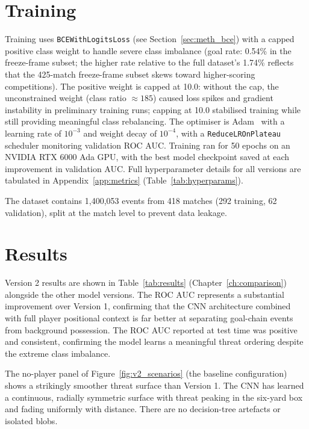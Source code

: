 \section{Training}

Training uses \texttt{BCEWithLogitsLoss} (see Section~\ref{sec:meth_bce}) with a capped positive class weight to handle severe class imbalance (goal rate: 0.54\% in the freeze-frame subset; the higher rate relative to the full dataset's 1.74\% reflects that the 425-match freeze-frame subset skews toward higher-scoring competitions). The positive weight is capped at 10.0: without the cap, the unconstrained weight (class ratio $\approx 185$) caused loss spikes and gradient instability in preliminary training runs; capping at 10.0 stabilised training while still providing meaningful class rebalancing. The optimiser is Adam~\cite{kingma2015} with a learning rate of $10^{-3}$ and weight decay of $10^{-4}$, with a \texttt{ReduceLROnPlateau} scheduler monitoring validation ROC AUC. Training ran for 50 epochs on an NVIDIA RTX 6000 Ada GPU, with the best model checkpoint saved at each improvement in validation AUC. Full hyperparameter details for all versions are tabulated in Appendix~\ref{app:metrics} (Table~\ref{tab:hyperparams}).

The dataset contains 1,400,053 events from 418 matches (292 training, 62 validation), split at the match level to prevent data leakage.

\section{Results}

Version 2 results are shown in Table~\ref{tab:results} (Chapter~\ref{ch:comparison}) alongside the other model versions. The ROC AUC represents a substantial improvement over Version 1, confirming that the CNN architecture combined with full player positional context is far better at separating goal-chain events from background possession. The ROC AUC reported at test time was positive and consistent, confirming the model learns a meaningful threat ordering despite the extreme class imbalance.

The no-player panel of Figure~\ref{fig:v2_scenarios} (the baseline configuration) shows a strikingly smoother threat surface than Version 1. The CNN has learned a continuous, radially symmetric surface with threat peaking in the six-yard box and fading uniformly with distance. There are no decision-tree artefacts or isolated blobs.

